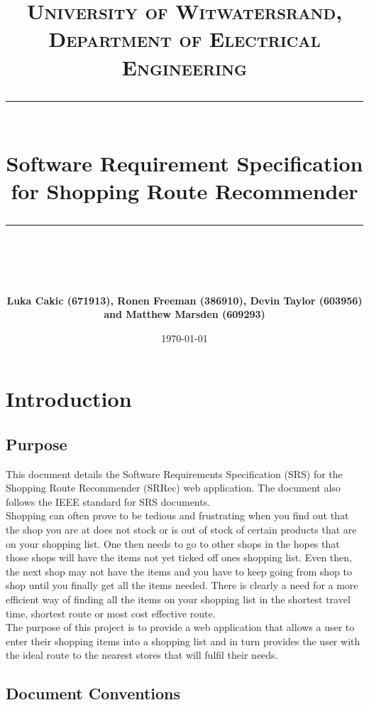 \documentclass[10pt, a4paper, onecolumn]{scrartcl}
\newcommand{\horrule}[1]{\rule{\linewidth}{#1}}
\begin{document}
	
	\title{\normalfont \normalsize
		\textsc{University of Witwatersrand, Department of Electrical Engineering} \\ [10pt]
		\horrule{0.5pt} \\ [10pt]
		\huge Software Requirement Specification for Shopping Route Recommender \\
		\horrule{2pt} \\ [10pt]}
	\author{\textbf{\normalsize{Luka Cakic (671913), Ronen Freeman (386910), Devin Taylor (603956) and Matthew Marsden (609293)}} \\ [10pt]}
	\date {\normalsize \today}
	
	\maketitle
	
	
	\section{Introduction}
	
		\subsection{Purpose}
		
			This document details the Software Requirements Specification (SRS) for the Shopping Route Recommender (SRRec) web application. The document also follows the IEEE standard for SRS documents.\\
			
			Shopping can often prove to be tedious and frustrating when you find out that the shop you are at does not stock or is out of stock of certain products that are on your shopping list. One then needs to go to other shops in the hopes that those shops will have the items not yet ticked off ones shopping list. Even then, the next shop may not have the items and you have to keep going from shop to shop until you finally get all the items needed. There is clearly a need for a more efficient way of finding all the items on your shopping list in the shortest travel time, shortest route or most cost effective route.\\
			
			The purpose of this project is to provide a web application that allows a user to enter their shopping items into a shopping list and in turn provides the user with the ideal route to the nearest stores that will fulfil their needs.
		
		\subsection{Document Conventions}
		
\end{document}
